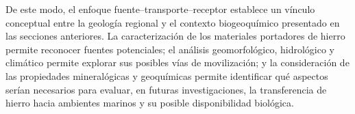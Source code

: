 De este modo, el enfoque fuente--transporte--receptor establece un vínculo conceptual entre la geología regional y el contexto biogeoquímico presentado en las secciones anteriores. La caracterización de los materiales portadores de hierro permite reconocer fuentes potenciales; el análisis geomorfológico, hidrológico y climático permite explorar sus posibles vías de movilización; y la consideración de las propiedades mineralógicas y geoquímicas permite identificar qué aspectos serían necesarios para evaluar, en futuras investigaciones, la transferencia de hierro hacia ambientes marinos y su posible disponibilidad biológica.